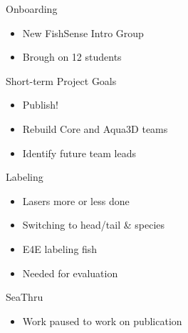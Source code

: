 \begin{frame}{Onboarding}
    \begin{itemize}
        \item New FishSense Intro Group
        \item Brough on 12 students
    \end{itemize}
\end{frame}

\begin{frame}{Short-term Project Goals}
    \begin{itemize}
        \item Publish!
        \item Rebuild Core and Aqua3D teams
        \item Identify future team leads
    \end{itemize}
\end{frame}

\begin{frame}{Labeling}
    \begin{itemize}
        \item Lasers more or less done
        \item Switching to head/tail \& species
        \item E4E labeling fish
        \item Needed for evaluation
    \end{itemize}
\end{frame}

\begin{frame}{SeaThru}
    \begin{itemize}
        \item Work paused to work on publication
    \end{itemize}
\end{frame}



